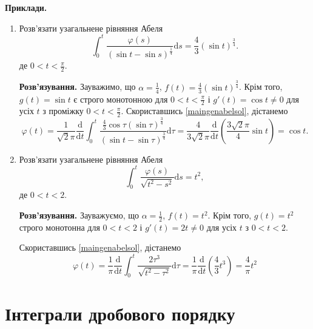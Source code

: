 \documentclass[14pt,twoside]{extreport}
\theoremstyle{mystyle}
\numberwithin{equation}{chapter}
\begin{document}
\begin{small}
	\textbf{Приклади.}
	
	\begin{enumerate}
		\item Розв'язати узагальнене рівняння Абеля
		\begin{equation}
		\displaystyle \int_{0}^{t}\frac{\varphi(s)}{(\sin t-\sin s)^{\frac{1}{4}}}\mathrm{d}s = \frac{4}{3}(\sin t)^{\frac{3}{4}}.
		\end{equation}
		де $0<t<\displaystyle \frac{\pi}{2}$.

		\textbf{Розв'язування.} Зауважимо, що $\displaystyle \alpha=\frac{1}{4}$, $f(t)=\displaystyle \frac{4}{3}(\sin t)^{\frac{3}{4}}$. Крім того, $g(t)=\sin t$ є строго монотонною для $0<t<\displaystyle \frac{\pi}{2}$ і $g'(t)=\cos t\neq 0$ для усіх $t$ з проміжку $0<t<\displaystyle \frac{\pi}{2}$.
		Скориставшись \eqref{maingenabelsol}, дістанемо
		$$
		\varphi(t)=\frac{1}{\sqrt{2}\pi}\frac{\mathrm{d}}{\mathrm{d}t}\int_{0}^{t}\frac{\frac{4}{3}\cos \tau(\sin \tau)^{\frac{3}{4}}}{(\sin t-\sin \tau)^{\frac{3}{4}}}\mathrm{d}\tau = \frac{4}{3\sqrt{2}\pi}\frac{\mathrm{d}}{\mathrm{d}t}\left(\frac{3\sqrt{2}\pi}{4}\sin t\right)=\cos t.
		$$
		
		\item Розв'язати узагальнене рівняння Абеля
		\begin{equation*}
		\displaystyle \int_{0}^{t}\frac{\varphi(s)}{\sqrt{t^{2}-s^{2}}}\mathrm{d}s = t^{2},
		\end{equation*}
		де $0<t<2$.

		\textbf{Розв'язування.} Зауважуємо, що $\displaystyle \alpha=\frac{1}{2}$, $f(t)=t^{2}$. Крім того, $g(t)=t^{2}$ строго монотонна для $0<t<2$ і $g'(t)=2t\neq 0$ для усіх $t$ з $0<t<2$.
		
		Скориставшись \eqref{maingenabelsol}, дістанемо
		\begin{equation}
		\varphi(t)=\displaystyle \frac{1}{\pi}\frac{\mathrm{d}}{\mathrm{d}t}\int_{0}^{t}\frac{2\tau^{3}}{\sqrt{t^{2}-\tau^{2}}}\mathrm{d}\tau=\frac{1}{\pi}\frac{\mathrm{d}}{\mathrm{d}t}\left(\frac{4}{3}t^{3}\right)=\frac{4}{\pi}t^{2}
		\end{equation}
	\end{enumerate}
\end{small}

\section{Інтеграли дробового порядку}
\end{document}
